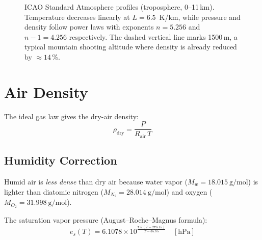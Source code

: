 \documentclass[11pt,twoside,openright]{report}
\begin{document}
\begin{figure}[H]
\centering
{}
\caption{ICAO Standard Atmosphere profiles (troposphere, 0--11\,km). Temperature decreases linearly at $L = 6.5$~K/km, while pressure and density follow power laws with exponents $n = 5.256$ and $n-1 = 4.256$ respectively. The dashed vertical line marks 1500\,m, a typical mountain shooting altitude where density is already reduced by $\approx 14$\,\%.}
\label{fig:isa_profile}
\end{figure}

\section{Air Density}

The ideal gas law gives the dry-air density:
\begin{equation}
  \rho_{\mathrm{dry}} = \frac{P}{R_{\mathrm{air}} \, T}
  \label{eq:rho_dry}
\end{equation}

\subsection{Humidity Correction}

Humid air is \emph{less dense} than dry air because water vapor ($M_{w}=\SI{18.015}{\gram\per\mole}$) is lighter than diatomic nitrogen ($M_{N_2}=\SI{28.014}{\gram\per\mole}$) and oxygen ($M_{O_2}=\SI{31.998}{\gram\per\mole}$).

The saturation vapor pressure (August--Roche--Magnus formula):
\begin{equation}
  e_s(T) = 6.1078 \times 10^{\frac{7.5\,(T - 273.15)}{T - 35.85}} \quad [\text{hPa}]
  \label{eq:sat_vapor}
\end{equation}
\end{document}
